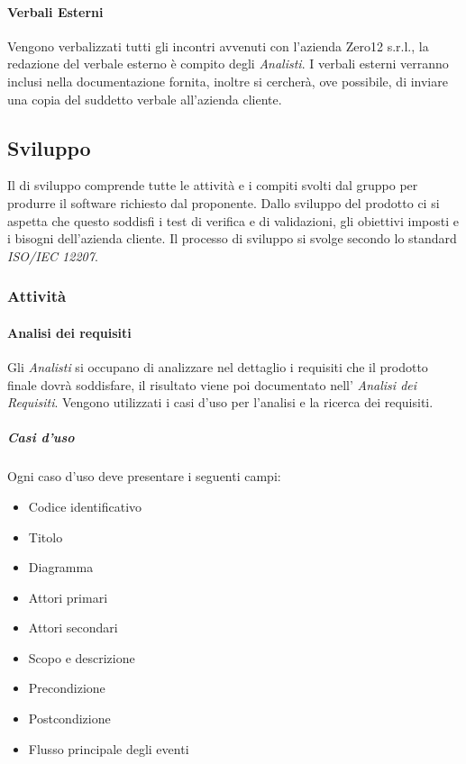 \paragraph{Verbali Esterni}
Vengono verbalizzati tutti gli incontri avvenuti con l'azienda Zero12 s.r.l., la redazione del verbale esterno è compito degli \textit{Analisti}. I verbali esterni verranno inclusi nella documentazione fornita, inoltre si cercherà, ove possibile, di inviare una copia del suddetto verbale all'azienda cliente.

\subsection{Sviluppo}
Il  di sviluppo comprende tutte le attività e i compiti svolti dal gruppo per produrre il software richiesto dal proponente. Dallo sviluppo del prodotto ci si aspetta che questo soddisfi i test di verifica e di validazioni, gli obiettivi imposti e i bisogni dell'azienda cliente. Il processo di sviluppo si svolge secondo lo standard \textit{ISO/IEC 12207}.

\subsubsection{Attività}

\paragraph{Analisi dei requisiti}
Gli \textit{Analisti} si occupano di analizzare nel dettaglio i requisiti che il prodotto finale dovrà soddisfare, il risultato viene poi documentato nell' \textit{Analisi dei Requisiti}. Vengono utilizzati i casi d'uso per l'analisi e la ricerca dei requisiti.

\subparagraph{Casi d'uso}
Ogni caso d'uso deve presentare i seguenti campi:
\begin{itemize}
	\item Codice identificativo
	\item Titolo
	\item Diagramma 
	\item Attori primari
	\item Attori secondari
	\item Scopo e descrizione
	\item Precondizione
	\item Postcondizione
	\item Flusso principale degli eventi
\end{itemize}

